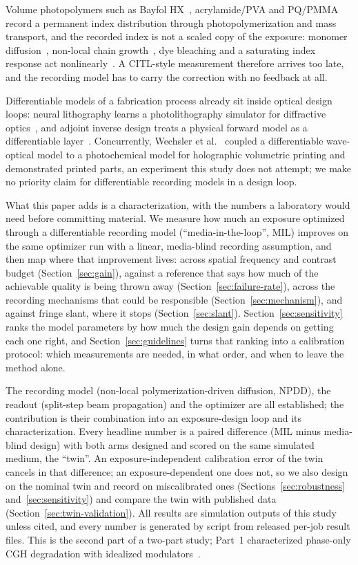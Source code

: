 \documentclass{optica-article}
\begin{document}
Volume photopolymers such as Bayfol HX~\cite{bruder2017bayfol},
acrylamide/PVA and PQ/PMMA~\cite{hsieh2022pqpmma} record a permanent index
distribution through photopolymerization and mass transport, and the recorded
index is not a scaled copy of the exposure: monomer
diffusion~\cite{zhao1994diffusion,sheridan2012reply}, non-local chain
growth~\cite{sheridan2000nonlocal,gleeson2008chain}, dye bleaching and a
saturating index response act nonlinearly~\cite{kowalski2016design}. A
CITL-style measurement therefore arrives too late, and the recording model has
to carry the correction with no feedback at all.

Differentiable models of a fabrication process already sit inside optical
design loops: neural lithography learns a photolithography simulator for
diffractive optics~\cite{zheng2023neural}, and adjoint inverse design treats a
physical forward model as a differentiable layer~\cite{hughes2018adjoint}.
Concurrently, Wechsler et
al.~\cite{wechsler2026shvam} coupled a differentiable wave-optical model to a
photochemical model for holographic volumetric printing and demonstrated
printed parts, an experiment this study does not attempt; we make no priority
claim for differentiable recording models in a design loop.

What this paper adds is a characterization, with the numbers a laboratory would
need before committing material. We measure how much an exposure optimized
through a differentiable recording model (``media-in-the-loop'', MIL) improves
on the same optimizer run with a linear, media-blind recording assumption, and
then map where that improvement lives: across spatial frequency and contrast
budget (Section~\ref{sec:gain}), against a reference that says how much of the
achievable quality is being thrown away (Section~\ref{sec:failure-rate}),
across the recording mechanisms that could be responsible
(Section~\ref{sec:mechanism}), and against fringe slant, where it stops
(Section~\ref{sec:slant}). Section~\ref{sec:sensitivity} ranks the model
parameters by how much the design gain depends on getting each one right, and
Section~\ref{sec:guidelines} turns that ranking into a calibration protocol:
which measurements are needed, in what order, and when to leave the method
alone.

The recording model (non-local polymerization-driven diffusion, NPDD), the
readout (split-step beam propagation) and the optimizer are all established;
the contribution is their combination into an exposure-design loop and its
characterization. Every headline number is a paired difference (MIL minus
media-blind design) with both arms designed and scored on the same simulated
medium, the ``twin''. An exposure-independent calibration error of the twin
cancels in that difference; an exposure-dependent one does not, so we also
design on the nominal twin and record on miscalibrated ones
(Sections~\ref{sec:robustness} and~\ref{sec:sensitivity}) and compare the twin
with published data (Section~\ref{sec:twin-validation}). All results are
simulation outputs of this study unless cited, and every number is generated by
script from released per-job result files. This is the second part of a
two-part study; Part~1 characterized phase-only CGH degradation with idealized
modulators~\cite{tripathi2025holoforge}.
\end{document}
